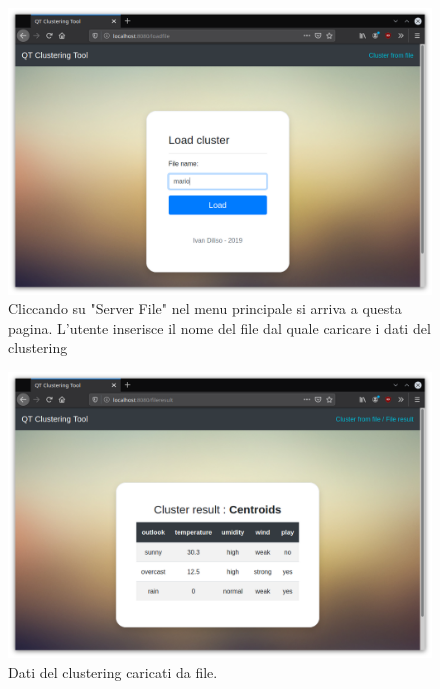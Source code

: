 \documentclass{article}
\begin{document}
    \begin{figure}[H]
        \includegraphics[scale=0.4]{ADDON6}
        \caption{Cliccando su "Server File" nel menu principale si arriva 
        a questa pagina. L'utente inserisce il nome del file dal quale 
        caricare i dati del clustering}   
        \label{fig:10}
    \end{figure} 
    \begin{figure}[H]
        \includegraphics[scale=0.4]{ADDON7}
        \caption{Dati del clustering caricati da file.}   
        \label{fig:11}
    \end{figure} 
\end{document}
